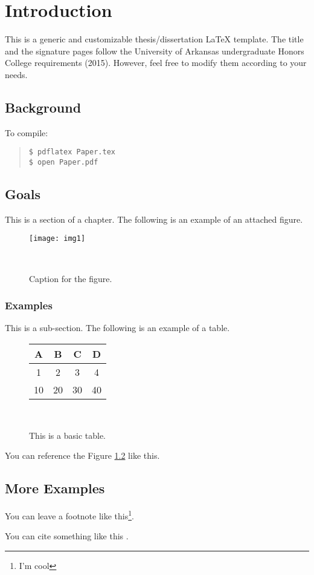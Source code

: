 \chapter{Introduction}

This is a generic and customizable thesis/dissertation \LaTeX{} template. The title and the signature pages follow the University of Arkansas undergraduate Honors College requirements (2015). However, feel free to modify them according to your needs.

\section{Background}

To compile:

\begin{quote}
  \begin{Verbatim}
$ pdflatex Paper.tex
$ open Paper.pdf
  \end{Verbatim}
\end{quote}  

\section{Goals}

This is a section of a chapter. The following is an example of an attached figure.

\begin{figure}[H]
\centering
    \texttt{[image: img1]}
    \caption{Caption for the figure.}~\label{fig:mona_lisa}
\end{figure}


\subsection{Examples}

This is a sub-section. The following is an example of a table.

\begin{figure}[H]
\centering
\singlespacing
\begin{tabular}{c c c c}
  A & B & C & D \\
  \hline
  1 & 2 & 3 & 4 \\  
  10 & 20 & 30 & 40 \\
\end{tabular}
\caption{This is a basic table.}~\label{fig:tab_1}
\end{figure}

You can reference the Figure \ref{fig:tab_1} like this.

\section{More Examples}

You can leave a footnote like this\footnote{I'm cool}.

\noindent 
You can cite something like this \cite{einstein}.
